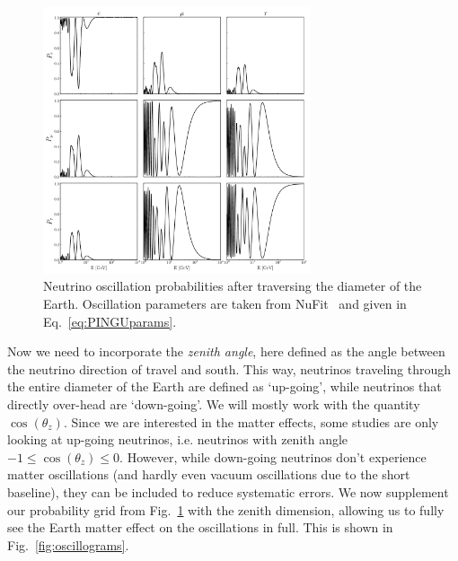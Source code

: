 \begin{figure}
    \centering
    \includegraphics[width=0.7\textwidth]{figures/oscillations.pdf}
    \caption{Neutrino oscillation probabilities after traversing the diameter of the Earth. 
    Oscillation parameters are taken from NuFit~\cite{nufit} and given in Eq.~\ref{eq:PINGUparams}.}\label{fig:oscillations}
\end{figure}

Now we need to incorporate the \emph{zenith angle}, here defined as the angle between the neutrino direction of travel and south.
This way, neutrinos traveling through the entire diameter of the Earth are defined as `up-going', while
neutrinos that directly over-head are `down-going'. We will mostly work with the quantity $\cos{(\theta_z)}$.
Since we are interested in the matter effects, some studies are only looking at up-going neutrinos, i.e. neutrinos with
zenith angle $-1 \le \cos{(\theta_z)} \le 0$. However, while down-going neutrinos don't experience matter oscillations (and hardly even vacuum
oscillations due to the short baseline), they can be included to reduce systematic errors.
We now supplement our probability grid from Fig.~\ref{fig:oscillations} with the zenith dimension,
allowing us to fully see the Earth matter effect on the oscillations in full. This is shown in Fig.~\ref{fig:oscillograms}.

